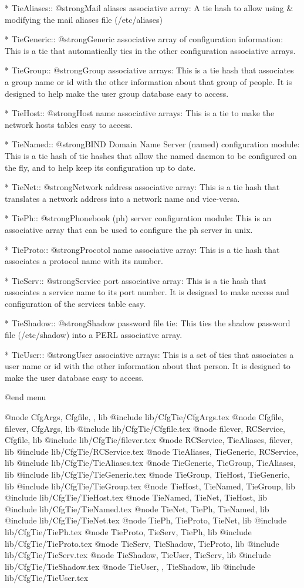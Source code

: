 * TieAliases::	@strong{Mail aliases associative array:} A tie hash to allow using & modifying the mail aliases file (/etc/aliases) 

* TieGeneric::	@strong{Generic associative array of configuration information:}  This is a tie that automatically ties in the other configuration associative arrays. 

* TieGroup::	@strong{Group associative arrays:} This is a tie hash that associates a group name or id with the other information about that group of people.  It is designed to help make the user group database easy to access. 

* TieHost::	@strong{Host name associative arrays:} This is a tie to make the network hosts tables easy to access. 

* TieNamed::	@strong{BIND Domain Name Server (named) configuration module:} This is a tie hash of tie hashes that allow the named daemon to be configured on the fly, and to help keep its configuration up to date. 

* TieNet::	@strong{Network address associative array:} This is a tie hash that translates a network address into a network name and vice-versa. 

* TiePh::	@strong{Phonebook (ph) server configuration module:} This is an associative array that can be used to configure the ph server in unix. 

* TieProto::	@strong{Procotol name associative array:} This is a tie hash that associates a protocol name with its number. 

* TieServ::	@strong{Service port associative array:} This is a tie hash that associates a service name to its port number.  It is designed to make access and configuration of the services table easy. 

* TieShadow::	@strong{Shadow password file tie:}  This ties the shadow password file (/etc/shadow) into a PERL associative array. 

* TieUser::	@strong{User associative arrays:} This is a set of ties that associates a user name or id with the other information about that person.  It is designed to make the user database easy to access. 

@end menu

@node CfgArgs,	Cfgfile,	,	lib
@include lib/CfgTie/CfgArgs.tex
@node Cfgfile,	filever,	CfgArgs,	lib
@include lib/CfgTie/Cfgfile.tex
@node filever,	RCService,	Cfgfile,	lib
@include lib/CfgTie/filever.tex
@node RCService,	TieAliases,	filever,	lib
@include lib/CfgTie/RCService.tex
@node TieAliases,	TieGeneric,	RCService,	lib
@include lib/CfgTie/TieAliases.tex
@node TieGeneric,	TieGroup,	TieAliases,	lib
@include lib/CfgTie/TieGeneric.tex
@node TieGroup,	TieHost,	TieGeneric,	lib
@include lib/CfgTie/TieGroup.tex
@node TieHost,	TieNamed,	TieGroup,	lib
@include lib/CfgTie/TieHost.tex
@node TieNamed,	TieNet,	TieHost,	lib
@include lib/CfgTie/TieNamed.tex
@node TieNet,	TiePh,	TieNamed,	lib
@include lib/CfgTie/TieNet.tex
@node TiePh,	TieProto,	TieNet,	lib
@include lib/CfgTie/TiePh.tex
@node TieProto,	TieServ,	TiePh,	lib
@include lib/CfgTie/TieProto.tex
@node TieServ,	TieShadow,	TieProto,	lib
@include lib/CfgTie/TieServ.tex
@node TieShadow,	TieUser,	TieServ,	lib
@include lib/CfgTie/TieShadow.tex
@node TieUser,	,	TieShadow,	lib
@include lib/CfgTie/TieUser.tex
